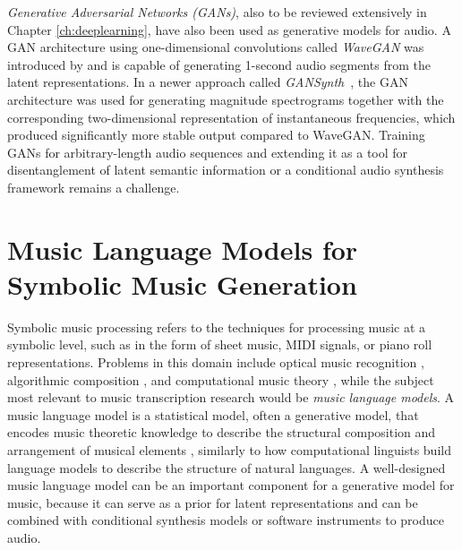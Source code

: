 \textit{Generative Adversarial Networks (GANs)}, also to be reviewed extensively in Chapter \ref{ch:deeplearning}, have also been used as generative models for audio.
A GAN architecture using one-dimensional convolutions called \emph{WaveGAN} was introduced by  and is capable of generating 1-second audio segments from the latent representations.
In a newer approach called \emph{GANSynth}~\cite{engel2019gansynth}, the GAN architecture was used for generating magnitude spectrograms together with the corresponding two-dimensional representation of instantaneous frequencies, which produced significantly more stable output compared to WaveGAN.
Training GANs for arbitrary-length audio sequences and extending it as a tool for disentanglement of latent semantic information or a conditional audio synthesis framework remains a challenge.

\section{Music Language Models for Symbolic Music Generation}

Symbolic music processing refers to the techniques for processing music at a symbolic level, such as in the form of sheet music, MIDI signals, or piano roll representations.
Problems in this domain include optical music recognition \cite{rebelo2012omr}, algorithmic composition \cite{fernandez2013ai}, and computational music theory \cite{hamanaka2013computational}, while the subject most relevant to music transcription research would be \emph{music language models}.
A music language model is a statistical model, often a generative model, that encodes music theoretic knowledge to describe the structural composition and arrangement of musical elements \cite{patel2010musiclanguage}, similarly to how computational linguists build language models to describe the structure of natural languages.
A well-designed music language model can be an important component for a generative model for music, because it can serve as a prior for latent representations and can be combined with conditional synthesis models or software instruments to produce audio.

